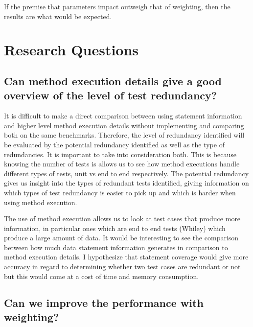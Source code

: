 If the premise that parameters impact outweigh that of weighting, then the results are what would be expected. 

\section{Research Questions}

\subsection{Can method execution details give a good overview of the level of test redundancy?}

It is difficult to make a direct comparison between using statement information and higher level method execution details without implementing and comparing both on the same benchmarks. Therefore, the level of redundancy identified will be evaluated by the potential redundancy identified as well as the type of redundancies. It is important to take into consideration both. This is because knowing the number of tests is allows us to see how method executions handle different types of tests, unit vs end to end respectively. The potential redundancy gives us insight into the types of redundant tests identified, giving information on which types of test redundancy is easier to pick up and which is harder when using method execution.


The use of method execution allows us to look at test cases that produce more information, in particular ones which are end to end tests (Whiley) which produce a large amount of data. It would be interesting to see the comparison between how much data statement information generates in comparison to method execution details. I hypothesize that statement coverage would give more accuracy in regard to determining whether two test cases are redundant or not but this would come at a cost of time and memory consumption.


\subsection{Can we improve the performance with weighting?}

